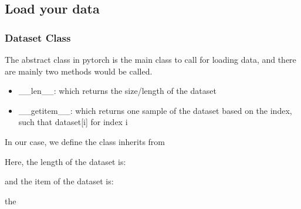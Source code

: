 \documentclass[letterpaper,10pt,english]{sphinxmanual}
\begin{document}
\subsection{Load your data}
\label{\detokenize{usage/data:load-your-data}}

\subsubsection{Dataset Class}
\label{\detokenize{usage/data:dataset-class}}
The abstract class in pytorch  is the main class to call for loading data, and there are mainly two methods would be called.
\begin{itemize}
\item {} 
\_\_len\_\_: which returns the size/length of the dataset

\item {} 
\_\_getitem\_\_: which returns one sample of the dataset based on the index, such that dataset{[}i{]} for index i

\end{itemize}

In our case, we define the class  inherits from 

Here, the length of the dataset is:

%
\begin{sphinxVerbatim}[commandchars=\\\{\}]
 

     
\end{sphinxVerbatim}

and the item of the dataset is:

%
\begin{sphinxVerbatim}[commandchars=\\\{\}]
  

      \PYG{p}{[}\PYG{p}{]}
\end{sphinxVerbatim}

the 
\end{document}
